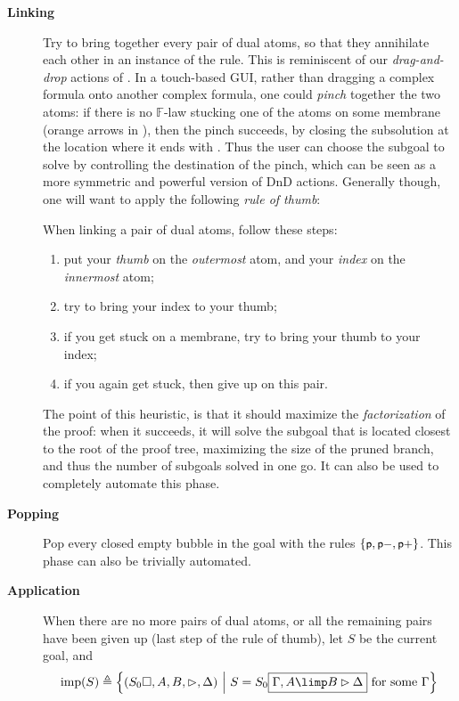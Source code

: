 \begin{description}
  \item[\textbf{Linking}] Try to bring together every pair of dual atoms, so
    that they annihilate each other in an instance of the 
    rule. This is reminiscent of our \emph{drag-and-drop} actions of
    . In a touch-based GUI, rather than dragging a complex formula
    onto another complex formula, one could \emph{pinch} together the two atoms:
    if there is no $\mathbb{F}$-law stucking one of the atoms on some membrane
    (orange arrows in ), then the pinch succeeds, by
    closing the subsolution at the location where it ends with
    . Thus the user can choose the subgoal to solve by
    controlling the destination of the pinch, which can be seen as a more
    symmetric and powerful version of DnD actions. Generally though, one will
    want to apply the following \emph{rule of thumb}:
    \begin{fact}
      When linking a pair of dual atoms, follow these steps:
      \begin{enumerate}
        \item put your \emph{thumb} on the \emph{outermost} atom, and your
              \emph{index} on the \emph{innermost} atom;
        \item try to bring your index to your thumb;
        \item if you get stuck on a membrane, try to bring your thumb to your
              index;
        \item if you again get stuck, then give up on this pair.
      \end{enumerate}
    \end{fact}
    The point of this heuristic, is that it should maximize the
    \emph{factorization} of the proof: when it succeeds, it will solve the subgoal
    that is located closest to the root of the proof tree, maximizing the size of
    the pruned branch, and thus the number of subgoals solved in one go. It can
    also be used to completely automate this phase.

  \item[\textbf{Popping}] Pop every closed empty bubble in the goal with the
  rules $\{\text{\small$\mathsf{p}$},\text{\small$\mathsf{p{-}}$},\text{\small$\mathsf{p{+}}$}\}$. This phase can also be trivially
  automated.

  \item[\textbf{Application}] When there are no more pairs of dual atoms, or all
    the remaining pairs have been given up (last step of the rule of thumb), let
    $S$ be the current goal, and
    $$\imps{S} \defeq \compr{(S_0\hole, A, B, \J, \Delta)}{S = S_0\select{\Gamma,
          A \limp B \J \Delta} \text{ for some $\Gamma$}}$$


\end{description}
